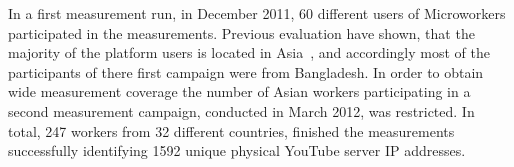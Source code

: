 In a first measurement run, in December 2011, 60 different users of Microworkers participated in the measurements.
Previous evaluation have shown, that the majority of the platform users is located in Asia~\cite{conf2011-410}, and accordingly most of the participants of there first campaign were from Bangladesh.
In order to obtain wide measurement coverage the number of Asian workers participating in a second measurement campaign, conducted in March 2012, was restricted.
In total, 247 workers from 32 different countries, finished the measurements successfully identifying 1592 unique physical YouTube server IP addresses.
